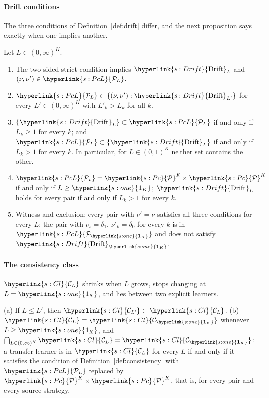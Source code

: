 \documentclass[11pt]{article}
\newcommand{\sy}[2]{\hyperlink{#1}{#2}}
\newcommand{\Pc}{\sy{s:Pc}{\mathcal{P}}}
\newcommand{\PcL}[1][L]{\sy{s:PcL}{\mathcal{P}_{#1}}}
\newcommand{\ClL}[1][L]{\sy{s:Cl}{\mathcal{C}_{#1}}}
\newcommand{\Drift}{\sy{s:Drift}{\mathrm{Drift}}}
\newcommand{\one}{\sy{s:one}{\mathbf{1}_{K}}}
\begin{document}
\paragraph{Drift conditions} The three conditions of Definition~\ref{def:drift} differ, and the
next proposition says exactly when one implies another.

\begin{proposition}\label{prop:drift}
Let $L\in(0,\infty)^K$.
\begin{enumerate}
\item[(a)] The two-sided strict condition implies $\Drift_L$ and $(\nu,\nu')\in\PcL$.
\item[(b)] $\PcL\subset\{(\nu,\nu'):\Drift_{L'}\}$ for every $L'\in(0,\infty)^K$ with $L'_k>L_k$ for all $k$.
\item[(c)] $\{\Drift_L\}\subset\PcL$ if and only if $L_k\ge1$ for every $k$; and
  $\PcL\subset\{\Drift_L\}$ if and only if $L_k>1$ for every $k$. In particular, for
  $L\in(0,1)^K$ neither set contains the other.
\item[(d)] $\PcL=\Pc^K\times\Pc^K$ if and only if $L\ge\one$; $\Drift_L$ holds for every pair if and
  only if $L_k>1$ for every $k$.
\item[(e)] Witness and exclusion: every pair with $\nu'=\nu$ satisfies all three conditions for every
  $L$; the pair with $\nu_k=\delta_1$, $\nu'_k=\delta_0$ for every $k$ is in $\PcL[\one]$ and does not
  satisfy $\Drift_{\one}$.
\end{enumerate}
\end{proposition}

\paragraph{The consistency class} $\ClL$ shrinks when $L$ grows, stops changing at $L=\one$, and
lies between two explicit learners.

\begin{proposition}\label{prop:classes}
(a) If $L\le L'$, then $\ClL[L']\subset\ClL$. (b) $\ClL=\ClL[\one]$ whenever $L\ge\one$, and
$\bigcap_{L\in(0,\infty)^K}\ClL=\ClL[\one]$: a transfer learner is in $\ClL$ for every $L$ if and
only if it satisfies the condition of Definition~\ref{def:consistency} with $\PcL$ replaced by
$\Pc^K\times\Pc^K$, that is, for every pair and every source strategy.
\end{proposition}
\end{document}
